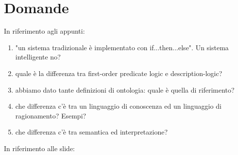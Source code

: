 \chapter{Domande}
\label{chp:questions}

In riferimento agli appunti:

\begin{enumerate}
	
	\item "un sistema tradizionale è implementato con if...then...else". Un sistema intelligente no?
	
	\item quale è la differenza tra first-order predicate logic e description-logic?
	
	\item abbiamo dato tante definizioni di ontologia: quale è quella di riferimento?
	
	\item che differenza c'è tra un linguaggio di conoscenza ed un linguaggio di ragionamento? Esempi?
	
	\item che differenza c'è tra semantica ed interpretazione?
	
\end{enumerate}

In riferimento alle slide:

